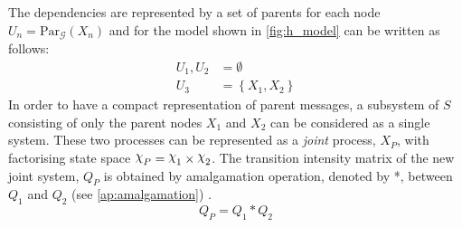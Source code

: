 The dependencies are represented by a set of parents for each node $ U_{n} = \mathrm{Par}_{\mathcal{G}}(X_n) $ and for the model shown in \cref{fig:h_model} can be written as follows:
\begin{align*}
U_{1}, U_{2} & = \emptyset \\
U_{3} & = \left\lbrace X_1, X_2 \right\rbrace 
\end{align*}
In order to have a compact representation of parent messages, a subsystem of $ S $ consisting of only the parent nodes $ X_1 $ and $ X_2 $ can be considered as a single system. These two processes can be represented as a \textit{joint} process, $ X_P $, with factorising state space $ \rchi_{P} = \rchi_1 \times \rchi_2  $. The transition intensity matrix of the new joint system, $ Q_P $ is obtained by amalgamation operation, denoted by *, between $ Q_{1} $ and  $ Q_{2} $ (see \cref{ap:amalgamation}) \cite{Nodelman1995}.
\begin{equation}
Q_P = Q_{1} * Q_{2}
\end{equation}

